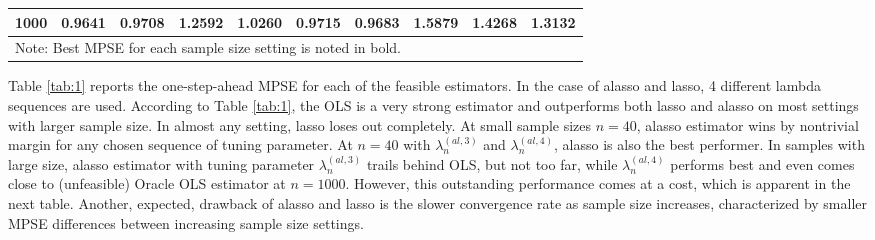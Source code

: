 \documentclass[12pt,a4paper]{article}
\begin{document}
\begin{table}[]
\begin{tabular}{cccccccccc}
\multicolumn{1}{|c|}{1000}                   & 0.9641                  & \multicolumn{1}{c|}{0.9708}               & 1.2592                  & 1.0260                  & 0.9715                  & \multicolumn{1}{c|}{\textbf{0.9683}}         & 1.5879                  & 1.4268                  & \multicolumn{1}{c|}{1.3132}                  \\ \hline
\multicolumn{10}{l}{Note: Best  MPSE for each sample size setting is noted in bold.}                                                                                                                                                                                                                                                              
\end{tabular}
\end{table}

Table \ref{tab:1} reports the one-step-ahead MPSE for each of the feasible estimators. In the case of alasso and lasso, 4 different lambda sequences are used. According to Table \ref{tab:1}, the OLS is a very strong estimator and outperforms both lasso and alasso on most settings with larger sample size.
In almost any setting, lasso loses out completely. At small sample sizes $ n = 40 $, alasso estimator wins by nontrivial margin for any chosen sequence of tuning parameter. At $ n = 40 $ with $ \lambda_n^{(al, 3)} $ and $ \lambda_n^{(al, 4)} $, alasso is also the best performer. In samples with large size, alasso estimator with tuning parameter $ \lambda_n^{(al, 3)} $ trails behind OLS, but not too far, while $ \lambda_n^{(al, 4)} $ performs best and even comes close to (unfeasible) Oracle OLS estimator at $ n = 1000 $. However, this outstanding performance comes at a cost, which is apparent in the next table. Another, expected, drawback of alasso and lasso is the slower convergence rate as sample size increases, characterized by smaller MPSE differences between increasing sample size settings.
\end{document}

